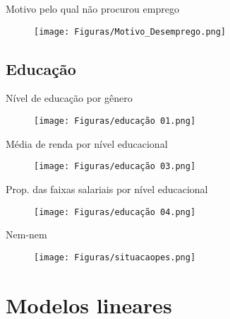 \documentclass[xcolor={dvipsnames}]{beamer}
\begin{document}
\begin{frame}{Motivo pelo qual não procurou emprego}
    \begin{figure}
        \centering
        \texttt{[image: Figuras/Motivo\_Desemprego.png]}
    \end{figure}
\end{frame}

\subsection{Educação}
\begin{frame}{Nível de educação por gênero}
    \begin{figure}
        \centering
        \texttt{[image: Figuras/educação 01.png]}
    \end{figure}
\end{frame}

\begin{frame}{Média de renda por nível educacional}
    \begin{figure}
        \centering
        \texttt{[image: Figuras/educação 03.png]}
    \end{figure}
\end{frame}

\begin{frame}{Prop. das faixas salariais por nível educacional}
    \begin{figure}
        \centering
        \texttt{[image: Figuras/educação 04.png]}
    \end{figure}
\end{frame}

\begin{frame}{Nem-nem}
    \begin{figure}
        \centering
        \texttt{[image: Figuras/situacaopes.png]}
    \end{figure}
\end{frame}
\section{Modelos lineares}
\begin{frame}
    \tableofcontents[currentsection]
\end{frame}
\end{document}
